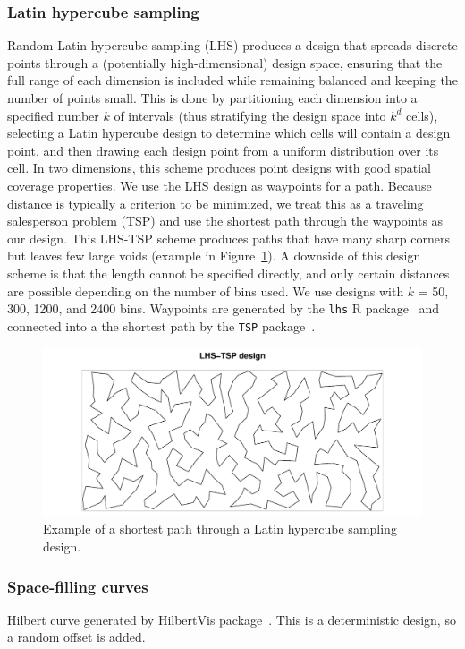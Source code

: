 \documentclass[review]{elsarticle}
\begin{document}
\subsubsection{Latin hypercube sampling}
Random Latin hypercube sampling (LHS) produces a design that spreads discrete
points through a (potentially high-dimensional) design space, ensuring that
the full range of each dimension is included while remaining balanced and
keeping the number of points small. This is done by partitioning each dimension
into a specified number \(k\) of intervals (thus stratifying the design space
into \(k^{d}\) cells), selecting a Latin hypercube design to determine which
cells will contain a design point, and then drawing each design point from a
uniform distribution over its cell. In two dimensions, this scheme produces
point designs with good spatial coverage properties. We use the LHS design as
waypoints for a path. Because distance is typically a criterion to be
minimized, we treat this as a traveling salesperson problem (TSP) and use the
shortest path through the waypoints as our design. This LHS-TSP scheme produces
paths that have many sharp corners but leaves few large voids (example in
Figure~\ref{lhstsp000161}). A downside of this design scheme is that the length
cannot be specified directly, and only certain distances are possible depending
on the number of bins used. We use designs with \(k\) = 50, 300, 1200,
and 2400 bins. Waypoints are generated by the \texttt{lhs} R package~\cite{lhs}
and connected into a the shortest path by the \texttt{TSP} package~\citep{tsp}.

\begin{figure}
\includegraphics[width=5in]{LHS-TSP000161.pdf}
\caption{Example of a shortest path through a Latin hypercube sampling design.}
\label{lhstsp000161}
\end{figure}

\subsubsection{Space-filling curves}
Hilbert curve generated by HilbertVis package~\citep{hilbertvis}. This is a
deterministic design, so a random offset is added.
\end{document}
